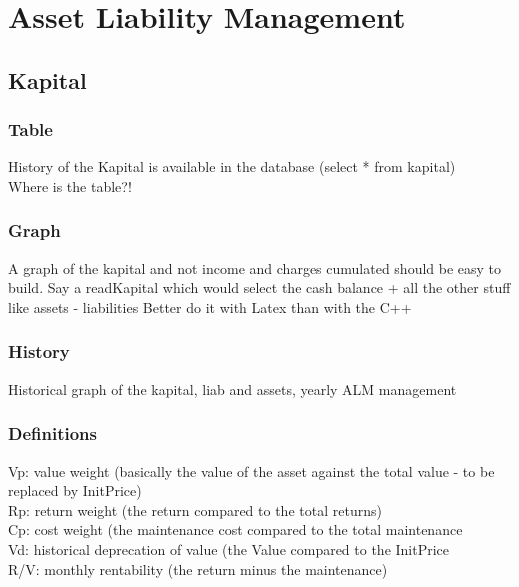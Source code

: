 \documentclass[8pt]{article} %
\begin{document}
\section{Asset Liability Management}

\subsection{Kapital}

\subsubsection{Table}
History of the Kapital is available in the database (select * from kapital)\\
Where is the table?!\\


\subsubsection{Graph}
A graph of the kapital and not income and charges cumulated should be easy to build.
Say a readKapital which would select the cash balance + all the other stuff like assets - liabilities
Better do it with Latex than with the C++ 

\subsubsection{History}
{\footnotesize
Historical graph of the kapital, liab and assets, yearly ALM management\\
}

\subsubsection{Definitions}
{\footnotesize
Vp: value weight (basically the value of the asset against the total value - to be replaced by InitPrice)\\
Rp: return weight (the return compared to the total returns)\\
Cp: cost weight (the maintenance cost compared to the total maintenance\\
Vd: historical deprecation of value (the Value compared to the InitPrice\\
R/V: monthly rentability (the return minus the maintenance)\\}
\end{document}
